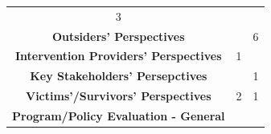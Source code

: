 \documentclass[]{tufte-handout}
\begin{document}
\begin{longtable}[]{@{}cll@{}}
\begin{minipage}[t]{0.22\columnwidth}
3\strut
\end{minipage} & \begin{minipage}[t]{0.22\columnwidth}\raggedright\strut
\strut
\end{minipage}\tabularnewline
\begin{minipage}[t]{0.47\columnwidth}\centering\strut
\textbf{Outsiders' Perspectives}\strut
\end{minipage} & \begin{minipage}[t]{0.22\columnwidth}\raggedright\strut
\strut
\end{minipage} & \begin{minipage}[t]{0.22\columnwidth}\raggedright\strut
6\strut
\end{minipage}\tabularnewline
\begin{minipage}[t]{0.47\columnwidth}\centering\strut
\textbf{Intervention Providers' Perspectives}\strut
\end{minipage} & \begin{minipage}[t]{0.22\columnwidth}\raggedright\strut
1\strut
\end{minipage} & \begin{minipage}[t]{0.22\columnwidth}\raggedright\strut
\strut
\end{minipage}\tabularnewline
\begin{minipage}[t]{0.47\columnwidth}\centering\strut
\textbf{Key Stakeholders' Persepctives}\strut
\end{minipage} & \begin{minipage}[t]{0.22\columnwidth}\raggedright\strut
\strut
\end{minipage} & \begin{minipage}[t]{0.22\columnwidth}\raggedright\strut
1\strut
\end{minipage}\tabularnewline
\begin{minipage}[t]{0.47\columnwidth}\centering\strut
\textbf{Victims'/Survivors' Perspectives}\strut
\end{minipage} & \begin{minipage}[t]{0.22\columnwidth}\raggedright\strut
2\strut
\end{minipage} & \begin{minipage}[t]{0.22\columnwidth}\raggedright\strut
1\strut
\end{minipage}\tabularnewline
\begin{minipage}[t]{0.47\columnwidth}\centering\strut
\textbf{Program/Policy Evaluation - General}\strut
\end{minipage} & \begin{minipage}[t]{0.22\columnwidth}\raggedright\strut

\end{minipage}
\end{longtable}
\end{document}
